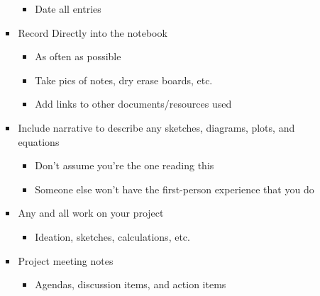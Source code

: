 \begin{itemize}
\begin{itemize}
\begin{itemize}
\begin{itemize}
              \item Date all entries

            \end{itemize}

          \item Record Directly into the notebook

            \begin{itemize}

              \item As often as possible

              \item Take pics of notes, dry erase boards, etc.

              \item Add links to other documents/resources used

            \end{itemize}

          \item Include narrative to describe any sketches, diagrams, plots, and equations

            \begin{itemize}

              \item Don't assume you're the one reading this

              \item Someone else won't have the first-person experience that you do
                
            \end{itemize}

          \item Any and all work on your project

            \begin{itemize}

              \item Ideation, sketches, calculations, etc.

            \end{itemize}

          \item Project meeting notes

            \begin{itemize}

              \item Agendas, discussion items, and action items

            \end{itemize}


\end{itemize}
\end{itemize}
\end{itemize}
